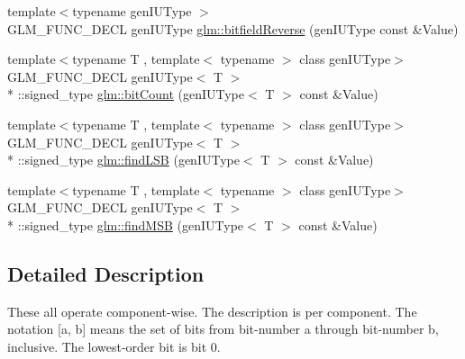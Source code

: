 \begin{DoxyCompactItemize}
\item 
{\footnotesize template$<$typename gen\-I\-U\-Type $>$ }\\G\-L\-M\-\_\-\-F\-U\-N\-C\-\_\-\-D\-E\-C\-L gen\-I\-U\-Type \hyperlink{group__core__func__integer_gac28880e609c6eeb0a28f1a54b1edc715}{glm\-::bitfield\-Reverse} (gen\-I\-U\-Type const \&Value)
\item 
{\footnotesize template$<$typename T , template$<$ typename $>$ class gen\-I\-U\-Type$>$ }\\G\-L\-M\-\_\-\-F\-U\-N\-C\-\_\-\-D\-E\-C\-L gen\-I\-U\-Type$<$ T $>$\\*
\-::signed\-\_\-type \hyperlink{group__core__func__integer_gaf5ecf64cbcb7f806a3c7915dd622209b}{glm\-::bit\-Count} (gen\-I\-U\-Type$<$ T $>$ const \&Value)
\item 
{\footnotesize template$<$typename T , template$<$ typename $>$ class gen\-I\-U\-Type$>$ }\\G\-L\-M\-\_\-\-F\-U\-N\-C\-\_\-\-D\-E\-C\-L gen\-I\-U\-Type$<$ T $>$\\*
\-::signed\-\_\-type \hyperlink{group__core__func__integer_ga43d5d9ec05ba4c46035c764ad5fd3135}{glm\-::find\-L\-S\-B} (gen\-I\-U\-Type$<$ T $>$ const \&Value)
\item 
{\footnotesize template$<$typename T , template$<$ typename $>$ class gen\-I\-U\-Type$>$ }\\G\-L\-M\-\_\-\-F\-U\-N\-C\-\_\-\-D\-E\-C\-L gen\-I\-U\-Type$<$ T $>$\\*
\-::signed\-\_\-type \hyperlink{group__core__func__integer_gaee931af2eaecf61b629b33899c9d6f29}{glm\-::find\-M\-S\-B} (gen\-I\-U\-Type$<$ T $>$ const \&Value)
\end{DoxyCompactItemize}


\subsection{Detailed Description}
These all operate component-\/wise. The description is per component. The notation \mbox{[}a, b\mbox{]} means the set of bits from bit-\/number a through bit-\/number b, inclusive. The lowest-\/order bit is bit 0. 

